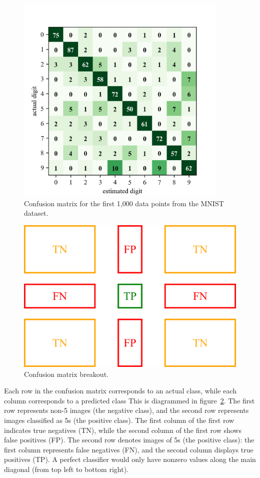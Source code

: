 \documentclass[12pt,letter]{article}
\begin{document}
\begin{figure}[H]
    \centering
    \includegraphics[width=4in]{../figures/digit_confusion_matrix_limited.png}
    \caption{Confusion matrix for the first 1,000 data points from the MNIST dataset.}
    \label{fig:confusion_matrix}
\end{figure}

\begin{figure}[H]
    \centering
    \includegraphics[]{../figures/confusion_matrix_breakout.png}
    \caption{Confusion matrix breakout.}
    \label{fig:confusion_matrix_breakout}
\end{figure}


Each row in the confusion matrix corresponds to an actual class, while each column corresponds to a predicted class This is diagrammed in figure~\ref{fig:confusion_matrix_breakout}. The first row represents non-5 images (the negative class), and the second row represents images classified as 5s (the positive class). The first column of the first row indicates true negatives (TN), while the second column of the first row shows false positives (FP). The second row denotes images of 5s (the positive class): the first column represents false negatives (FN), and the second column displays true positives (TP). A perfect classifier would only have nonzero values along the main diagonal (from top left to bottom right).
\end{document}
